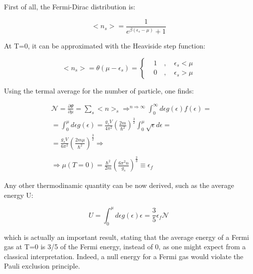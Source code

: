 \documentclass{article}
\begin{document}
First of all, the Fermi-Dirac distribution is:

\begin{equation}
    <n_s>=\frac{1}{e^{\beta(\epsilon_s-\mu)}+1}
\end{equation}

At T=0, it can be approximated with the Heaviside step function:

\begin{equation}
    <n_s>=\theta(\mu-\epsilon_s)=
    \left\{
    \begin{aligned}
         & 1 \quad , \quad \epsilon_s<\mu \\
         & 0 \quad , \quad \epsilon_s>\mu
    \end{aligned}
    \right.
\end{equation}

Using the termal average for the number of particle, one finds:

\begin{equation}
    \begin{aligned}
         & \mathcal{N}=\frac{\partial\Psi}{\partial \mu}=\sum_s <n>_s\Longrightarrow^{n\Longrightarrow\infty} \int_{0}^{\infty} d\epsilon g(\epsilon)f(\epsilon)= \\
         & =\int_{0}^{\mu} d\epsilon g(\epsilon)=\frac{g_sV}{4\pi^2}\left(\frac{2m}{\hbar^2}\right)^{\frac{3}{2}}\int_{0}^{\mu}\sqrt{\epsilon}d\epsilon=          \\
         & = \frac{g_sV}{6\pi^2}\left(\frac{2m\mu}{\hbar^2}\right)^{\frac{3}{2}}\Longrightarrow                                                                   \\                                                 \\
         & \Longrightarrow \mu(T=0)=\frac{\hbar^2}{2m}\left(\frac{6\pi^2n}{g_s}\right)^{\frac{2}{3}}\equiv \epsilon_f
    \end{aligned}
\end{equation}

Any other thermodinamic quantity can be now derived, such as the average energy U:

\begin{equation}
    U=\int_{0}^{\mu}d\epsilon g(\epsilon)\epsilon=\frac{3}{5}\epsilon_f\mathcal{N}
\end{equation}

which is actually an important result, stating that the average energy of a Fermi gas at T=0 is 3/5 of the Fermi energy, instead
of 0, as one might expect from a classical interpretation. Indeed, a null energy for a Fermi gas
would violate the Pauli exclusion principle.
\end{document}
